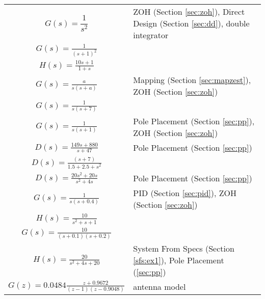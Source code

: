 \documentclass{article}
\begin{document}
{\tabulinesep=1.5mm
\begin{tabu}{|c|l|}
\hline
$\displaystyle G(s) = \dfrac{1}{s^2}$ & ZOH (Section \ref{sec:zoh}), Direct Design (Section \ref{sec:dd}), double integrator \\
$\displaystyle G(s) = \frac{1}{(s + 1)^2}$ & \\
$\displaystyle H(s) = \frac{10s + 1}{1 + s}$ & \\
$\displaystyle G(s) = \frac{a}{s(s + a)}$ & Mapping (Section \ref{sec:mapzest}), ZOH (Section \ref{sec:zoh}) \\
$\displaystyle G(s) = \frac{1}{s(s + 7)}$ & \\
$\displaystyle G(s) = \frac{1}{s(s + 1)}$ & Pole Placement (Section \ref{sec:pp}), ZOH (Section \ref{sec:zoh}) \\
$\displaystyle D(s) = \frac{149s + 880}{s + 47}$ & Pole Placement (Section \ref{sec:pp}) \\
$\displaystyle D(s) = \frac{(s + 7)}{1.5 + 2.5 + s^2}$ & \\
$\displaystyle D(s) = \frac{20s^2 + 20s}{s^2 + 4s}$ & Pole Placement (Section \ref{sec:pp}) \\
$\displaystyle G(s) = \frac{1}{s(s + 0.4)}$ & PID (Section \ref{sec:pid}), ZOH (Section \ref{sec:zoh}) \\
$\displaystyle H(s) = \frac{10}{s^2 + s + 1}$ & \\
$\displaystyle G(s) = \frac{10}{(s + 0.1)(s + 0.2)}$ & \\
$\displaystyle H(s) = \frac{20}{s^2 + 4s + 20}$ &  System From Specs (Section \ref{sfs:ex1}), Pole Placement (\ref{sec:pp}) \\
$\displaystyle G(z) = 0.0484 \frac{z + 0.9672}{(z - 1)(z - 0.9048)}$ & antenna model\autocite[Pg. 261]{franklin1998digital} \\
\hline
\end{tabu}}

\end{document}
